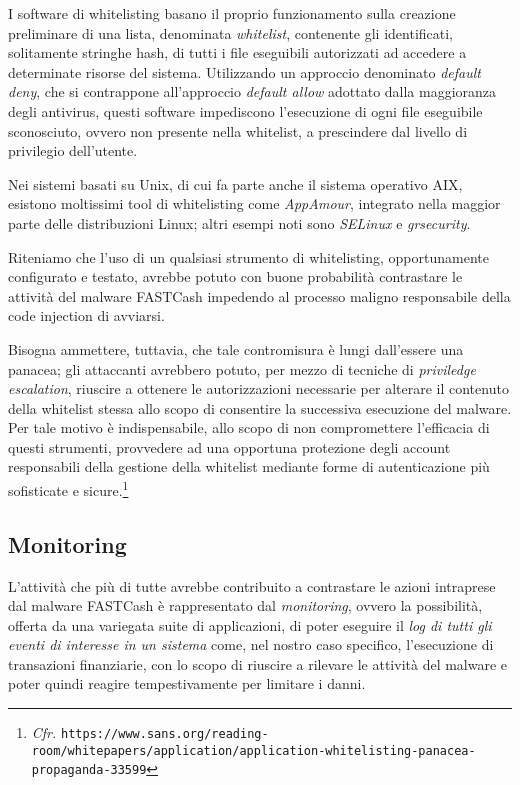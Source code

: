 \documentclass[10pt,a4paper, titlepage]{report}
\begin{document}
I software di whitelisting basano il proprio funzionamento sulla creazione preliminare di una lista, denominata \textit{whitelist}, contenente gli identificati, solitamente stringhe hash, di tutti i file eseguibili autorizzati ad accedere a determinate risorse del sistema. Utilizzando un approccio denominato \textit{default deny}, che si contrappone all'approccio \textit{default allow} adottato dalla maggioranza degli antivirus, questi software impediscono l'esecuzione di ogni file eseguibile sconosciuto, ovvero non presente nella whitelist, a prescindere dal livello di privilegio dell'utente.

Nei sistemi basati su Unix, di cui fa parte anche il sistema operativo AIX, esistono moltissimi tool di whitelisting come \textit{AppAmour}, integrato nella maggior parte delle distribuzioni Linux; altri esempi noti sono \textit{SELinux} e \textit{grsecurity}.

Riteniamo che l'uso di un qualsiasi strumento di whitelisting, opportunamente configurato e testato, avrebbe potuto con buone probabilità contrastare le attività del malware FASTCash impedendo al processo maligno responsabile della code injection di avviarsi. 

Bisogna ammettere, tuttavia, che tale contromisura è lungi dall'essere una panacea; gli attaccanti avrebbero potuto, per mezzo di tecniche di \textit{priviledge escalation}, riuscire a ottenere le autorizzazioni necessarie per alterare il contenuto della whitelist stessa allo scopo di consentire la successiva esecuzione del malware. Per tale motivo è indispensabile, allo scopo di non compromettere l'efficacia di questi strumenti, provvedere ad una opportuna protezione degli account responsabili della gestione della whitelist mediante forme di autenticazione più sofisticate e sicure.\footnote{\textit{Cfr.} \texttt{https://www.sans.org/reading-room/whitepapers/application/application-whitelisting-panacea-propaganda-33599}}

\subsection{Monitoring}

L'attività che più di tutte avrebbe contribuito a contrastare le azioni intraprese dal malware FASTCash è rappresentato dal \textit{monitoring}, ovvero la possibilità, offerta da una variegata suite di applicazioni, di poter eseguire il \textit{log di tutti gli eventi di interesse in un sistema} come, nel nostro caso specifico, l'esecuzione di transazioni finanziarie, con lo scopo di riuscire a rilevare le attività del malware e poter quindi reagire tempestivamente per limitare i danni.
\end{document}
